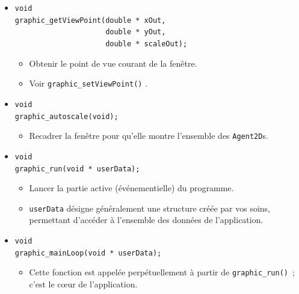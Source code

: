 \documentclass[12pt]{article}
\begin{document}
\begin{itemize}
      \verb!                     double scale);!
      \begin{itemize}
      \item Modifier le point de vue de la fen\^etre
      \item Le point $(x,y)$ repr\'esente le point du plan qui sera situ\'e
            au centre de la fen\^etre.
      \item \verb!scale! repr\'esente le facteur qui permet de passer des
            grandeurs sans dimension du plan aux \textit{pixels} de l'\'ecran.
      \end{itemize}
\item \verb!void! \\
      \verb!graphic_getViewPoint(double * xOut,! \\
      \verb!                     double * yOut,! \\
      \verb!                     double * scaleOut);!
      \begin{itemize}
      \item Obtenir le point de vue courant de la fen\^etre.
      \item Voir \verb!graphic_setViewPoint()! .
      \end{itemize}
\item \verb!void! \\
      \verb!graphic_autoscale(void);!
      \begin{itemize}
      \item Recadrer la fen\^etre pour qu'elle montre
            l'ensemble des \verb!Agent2D!s.
      \end{itemize}
\item \verb!void! \\
      \verb!graphic_run(void * userData);!
      \begin{itemize}
      \item Lancer la partie active (\'ev\'enementielle) du programme.
      \item \verb!userData! d\'esigne g\'en\'eralement une structure
            cr\'e\'ee par vos soins, permettant d'acc\'eder \`a l'ensemble
            des donn\'ees de l'application.
      \end{itemize}
\item \verb!void! \\
      \verb!graphic_mainLoop(void * userData);!
      \begin{itemize}
      \item Cette fonction est appel\'ee perp\'etuellement \`a partir
            de \verb!graphic_run()!~; c'est le c\oe ur de l'application.

\end{itemize}
\end{itemize}
\end{document}
